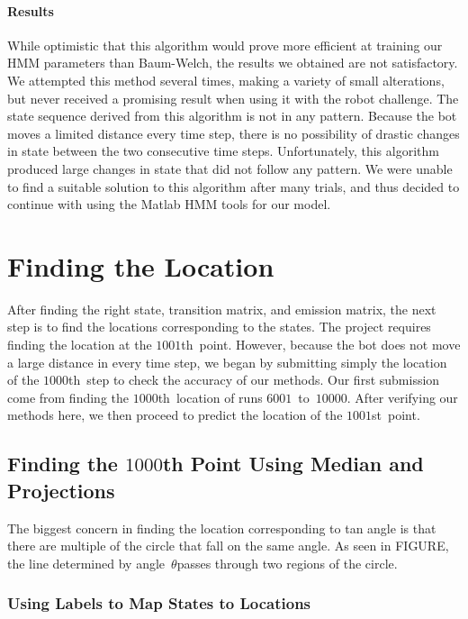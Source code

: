 \documentclass[twoside]{article}
\begin{document}
\paragraph{Results}

While optimistic that this algorithm would prove more efficient at training our HMM parameters than Baum-Welch, the results we obtained are not satisfactory.
We attempted this method several times, making a variety of small alterations, but never received a promising result when using it with the robot challenge.
The state sequence derived from this algorithm is not in any pattern.
Because the bot moves a limited distance every time step, there is no possibility of drastic changes in state between the two consecutive time steps.
Unfortunately, this algorithm produced large changes in state that did not follow any pattern.
We were unable to find a suitable solution to this algorithm after many trials, and thus decided to continue with using the Matlab HMM tools for our model.

\section{Finding the Location}\label{sec:finding-the-locat}

After finding the right state, transition matrix, and emission matrix, the next step is to find the locations corresponding to the states.
The project requires finding the location at the $\num{1001}$th~point.
However, because the bot does not move a large distance in every time step, we began by submitting simply the location of the $\num{1000}$th~step to check the accuracy of our methods.
Our first submission come from finding the $\num{1000}$th~location of runs $\num{6001}$~to~$\num{10000}$.
After verifying our methods here, we then proceed to predict the location of the $\num{1001}$st~point.

\subsection{Finding the $\num{1000}$th Point Using Median and Projections}\label{sec:find-num1000th-point}

The biggest concern in finding the location corresponding to tan angle is that there are multiple of the circle that fall on the same angle.
As seen in FIGURE, the line determined by angle~$\theta$passes through two regions of the circle.

\subsubsection{Using Labels to Map States to Locations}\label{sec:using-labels-map}
\end{document}

